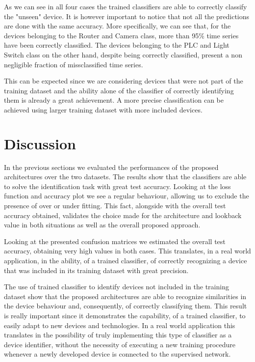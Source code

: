 As we can see in all four cases the trained classifiers are able to correctly classify the "unseen" device. It is however important to notice that not all the predictions are done with the same accuracy. More specifically, we can see that, for the devices belonging to the Router and Camera class, more than 95\% time series have been correctly classified. The devices belonging to the PLC and Light Switch class on the other hand, despite being correctly classified, present a non negligible fraction of missclassified time series.

This can be expected since we are considering devices that were not part of the training dataset and the ability alone of the classifier of correctly identifying them is already a great achievement. A more precise classification can be achieved using larger training dataset with more included devices.


\section{Discussion}

In the previous sections we evaluated the performances of the proposed architectures over the two datasets. The results show that the classifiers are able to solve the identification task with great test accuracy. Looking at the loss function and accuracy plot we see a regular behaviour, allowing us to exclude the presence of over or under fitting. This fact, alongside with the overall test accuracy obtained, validates the choice made for the architecture and lookback value in both situations as well as the overall proposed approach.

Looking at the presented confusion matrices we estimated the overall test accuracy, obtaining very high values in both cases. This translates, in a real world application, in the ability, of a trained classifier, of correctly recognizing a device that was included in its training dataset with great precision.

The use of trained classifier to identify devices not included in the training dataset show that the proposed architectures are able to recognize similarities in the device behaviour and, consequently, of correctly classifying them. This result is really important since it demonstrates the capability, of a trained classifier, to easily adapt to new devices and technologies. In a real world application this translates in the possibility of truly implementing this type of classifier as a device identifier, without the necessity of executing a new training procedure whenever a newly developed device is connected to the supervised network.
